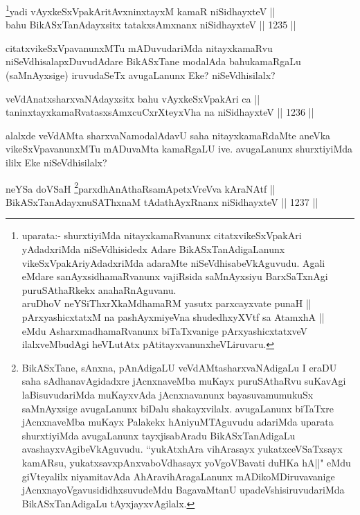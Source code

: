 \begin{shl}
\footnote{uparata:- shurxtiyiMda nitayxkamaRvanunx citatxvikeSxVpakAri yAdadxriMda niSeVdhisidedx Adare BikASxTanAdigaLanunx vikeSxVpakAriyAdadxriMda  adaraMte niSeVdhisabeVkAguvudu. Agali eMdare sanAyxsidhamaRvanunx vajiRsida saMnAyxsiyu BarxSaTxnAgi puruSAthaRkekx anahaRnAguvanu.\\aruDhoV neYSiThxrXkaMdhamaRM yasutx parxcayxvate punaH ||\\ pArxyashicxtatxM na pashAyxmiyeVna shudedhxyXVtf sa AtamxhA ||\\ eMdu AsharxmadhamaRvanunx biTaTxvanige pArxyashicxtatxveV ilalxveMbudAgi heVLutAtx pAtitayxvanunx\break  heVLiruvaru.}yadi vAyxkeSxVpakAritAvxninxtayxM kamaR niSidhayxteV || \\
bahu BikASxTanAdayxsitx tatakxsAmxnanx niSidhayxteV \hfill || 1235 ||  
\end{shl}

\begin{artha}
citatxvikeSxVpavanunxMTu mADuvudariMda nitayxkamaRvu niSeVdhi\-\break salapxDuvudAdare BikASxTane modalAda bahukamaRgaLu (saMnAyxsige) iruvudaSeTx avugaLanunx Eke? niSeVdhisilalx?
\end{artha}

\begin{shl}
veVdAnatxsharxvaNAdayxsitx bahu vAyxkeSxVpakAri ca ||  \\
taninxtayxkamaRvatasxsAmxcuCxrXteyxVha na niSidhayxteV \hfill || 1236 ||  
\end{shl}

\begin{artha}
alalxde veVdAMta sharxvaNamodalAdavU saha nitayxkamaRdaMte aneVka vikeSxVpavanunxMTu mADuvaMta kamaRgaLU ive. avugaLanunx shurxtiyiMda ililx Eke niSeVdhisilalx?
\end{artha}



\begin{shl}
neYSa doVSaH \footnote{BikASxTane, sAnxna, pAnAdigaLU veVdAMtasharxvaNAdigaLu I eraDU saha sAdhanavAgidadxre jAcnxnaveMba muKayx puruSAthaRvu suKavAgi laBisuvudariMda muKayxvAda jAcnxnavanunx bayasuva\break mumukuSx saMnAyxsige avugaLanunx biDalu shakayxvilalx. avugaLanunx biTaTxre jAcnxnaveMba muKayx Palakekx hAniyuMTAguvudu adariMda uparata shurxtiyiMda avugaLanunx tayxjisabAradu BikASxTanAdigaLu avashayxvAgibeVkAguvudu. ``yukAtxhAra vihArasayx yukatxceVSaTxsayx kamARsu, yukatxsavxpAnxvaboVdhasayx yoVgoVBavati duHKa hA||" eMdu giVteyalilx niyamitavAda AhAravihAragaLanunx mADikoMDiruvavanige jAcnxnayoVgavusididhxsuvudeMdu BagavaMtanU upadeVshisiruvudariMda BikASxTanAdigaLu tAyxjayxvAgilalx.}parxdhAnAthaRsamApetxVreVva kAraNAtf || \\
BikASxTanAdayxnuSAThxnaM tAdathAyxRnanx niSidhayxteV \hfill || 1237 ||  
\end{shl}

